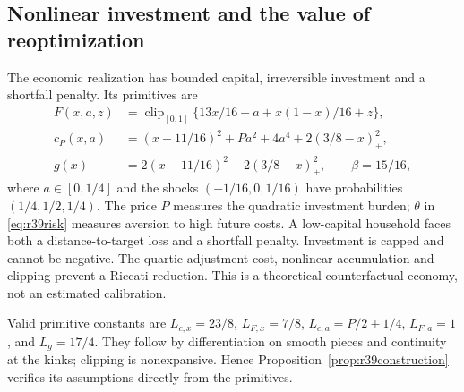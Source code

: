 \subsection{Nonlinear investment and the value of reoptimization}
\label{sec:r39economy}
The economic realization has bounded capital, irreversible investment and a
shortfall penalty. Its primitives are
\begin{align}
 F(x,a,z)&=\operatorname{clip}_{[0,1]}
       \{13x/16+a+x(1-x)/16+z\},\label{eq:r39capital}\\
 c_P(x,a)&=(x-11/16)^2+Pa^2+4a^4+2(3/8-x)_+^2,\nonumber\\
 g(x)&=2(x-11/16)^2+2(3/8-x)_+^2,\qquad \beta=15/16,\nonumber
\end{align}
where $a\in[0,1/4]$ and the shocks $(-1/16,0,1/16)$ have probabilities
$(1/4,1/2,1/4)$. The price $P$ measures the quadratic investment burden;
$\theta$ in \eqref{eq:r39risk} measures aversion to high future costs.
A low-capital household faces both a distance-to-target loss and a shortfall
penalty. Investment is capped and cannot be negative. The quartic adjustment
cost, nonlinear accumulation and clipping prevent a Riccati reduction.
This is a theoretical counterfactual economy, not an estimated calibration.

Valid primitive constants are $L_{c,x}=23/8$, $L_{F,x}=7/8$,
$L_{c,a}=P/2+1/4$, $L_{F,a}=1$, and $L_g=17/4$.
They follow by differentiation on smooth pieces and continuity at the kinks;
clipping is nonexpansive. Hence Proposition~\ref{prop:r39construction}
verifies its assumptions directly from the primitives.

